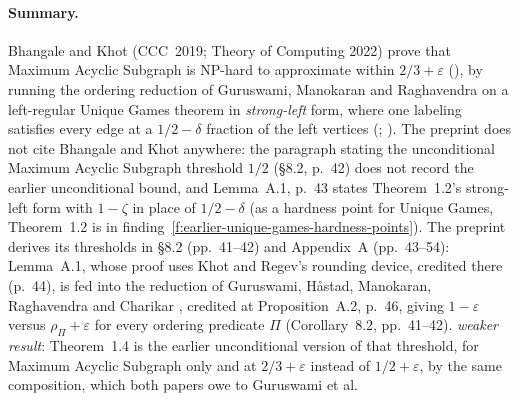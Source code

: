 \documentclass[11pt]{article}
\newcommand{\ploc}[2]{#1}
\newcommand{\sloc}[2]{\cite[#2]{#1}}
\newcommand{\rel}[1]{\textit{#1}}
\newcounter{finding}
\begin{document}
\paragraph{Summary.}
Bhangale and Khot \cite{BhangaleKhot2019-UGHardnessToNPHardnessByLosingHalf}
(CCC~2019; Theory of Computing 2022) prove that Maximum Acyclic Subgraph is
NP-hard to approximate within $2/3+\varepsilon$
(\sloc{BhangaleKhot2019-UGHardnessToNPHardnessByLosingHalf}{Thm~1.4, p.~5}),
by running the ordering reduction of Guruswami, Manokaran and Raghavendra
\cite{GuruswamiManokaranRaghavendra2008-BeatingRandomOrderingMAS} on a
left-regular Unique Games theorem in \emph{strong-left} form, where one
labeling satisfies every edge at a $1/2-\delta$ fraction of the left vertices
(\sloc{BhangaleKhot2019-UGHardnessToNPHardnessByLosingHalf}{Thm~1.2, p.~3};
\sloc{BhangaleKhot2019-UGHardnessToNPHardnessByLosingHalf}{\S5, pp.~21--23}).
The preprint does not cite Bhangale and Khot anywhere: the paragraph stating
the unconditional Maximum Acyclic Subgraph threshold $1/2$
(\ploc{\S8.2, p.~42}{07-consequences.tex:220--224}) does not record the
earlier unconditional bound, and
\ploc{Lemma~A.1, p.~43}{finite-consequences.tex:22--34} states Theorem~1.2's
strong-left form with $1-\zeta$ in place of $1/2-\delta$ (as a hardness point
for Unique Games, Theorem~1.2 is in finding~\ref{f:earlier-unique-games-hardness-points}).
The preprint derives its thresholds in
\ploc{\S8.2 (pp.~41--42)}{07-consequences.tex:160--230} and
\ploc{Appendix~A (pp.~43--54)}{finite-consequences.tex:1--988}: Lemma~A.1,
whose proof uses Khot and Regev's rounding device, credited there
(\ploc{p.~44}{finite-consequences.tex:36--39}), is fed into the reduction of
Guruswami, H\aa stad, Manokaran, Raghavendra and Charikar
\sloc{GuruswamiEtAl2011-BeatingRandomOrderingIsHard}{Conj.~3.8, p.~14; Thm~7.1, p.~20},
credited at \ploc{Proposition~A.2, p.~46}{finite-consequences.tex:242--265},
giving $1-\varepsilon$ versus $\rho_\Pi+\varepsilon$ for every ordering
predicate $\Pi$ (\ploc{Corollary~8.2, pp.~41--42}{07-consequences.tex:190--218}).
\rel{weaker result}: Theorem~1.4 is the earlier unconditional version of that
threshold, for Maximum Acyclic Subgraph only and at $2/3+\varepsilon$ instead
of $1/2+\varepsilon$, by the same composition, which both papers owe to
Guruswami et al.
\end{document}
